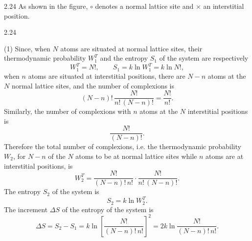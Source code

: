 \begin{solution}{2.24}
As shown in the figure, $\circ$ denotes a normal lattice site and $\times$ an interstitial
position.

\begin{figbox}{2.24}
\end{figbox}

(1) Since, when $N$ atoms are situated at normal lattice sites, their thermodynamic probability
$W_1^T$ and the entropy $S_1$ of the system are respectively
\begin{equation*}
W_1^T = N!,\qquad S_1 = k\ln W_1^T = k\ln N!,
\end{equation*}
when $n$ atoms are situated at interstitial positions, there are $N-n$ atoms at the $N$ normal
lattice sites, and the number of complexions is
\begin{equation*}
(N-n)!\,\frac{N!}{n!\,(N-n)!} = \frac{N!}{n!}.
\end{equation*}
Similarly, the number of complexions with $n$ atoms at the $N$ interstitial positions is
\begin{equation*}
\frac{N!}{(N-n)!}.
\end{equation*}
Therefore the total number of complexions, i.e. the thermodynamic probability $W_2$, for $N-n$
of the $N$ atoms to be at normal lattice sites while $n$ atoms are at interstitial positions, is
\begin{equation*}
W_2^T = \frac{N!}{(N-n)!\,n!}\cdot\frac{N!}{n!\,(N-n)!}.
\end{equation*}
The entropy $S_2$ of the system is
\begin{equation*}
S_2 = k\ln W_2^T .
\end{equation*}
The increment $\Delta S$ of the entropy of the system is
\begin{equation*}
\Delta S = S_2 - S_1
= k\ln\left[\frac{N!}{(N-n)!\,n!}\right]^2
= 2k\ln\frac{N!}{(N-n)!\,n!}.
\end{equation*}


\end{solution}
